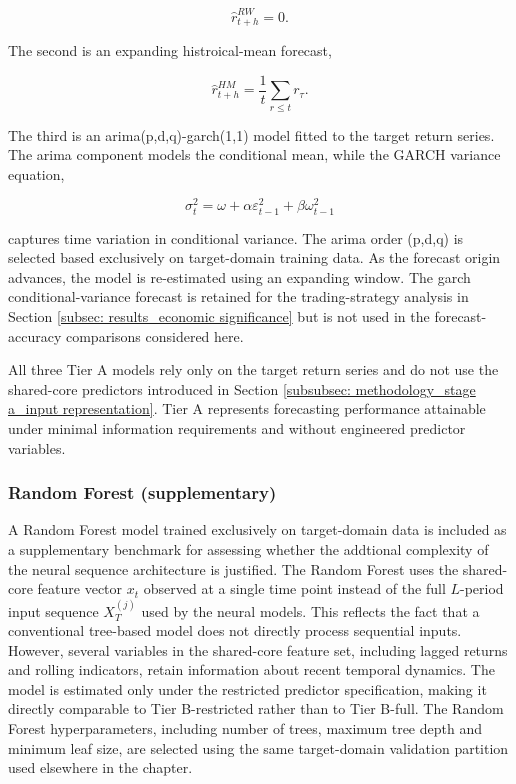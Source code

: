 \begin{equation}
    \hat r_{t+h}^{RW}=0.
\end{equation}

\noindent The second is an expanding histroical-mean forecast, 

\begin{equation}
    \hat{r}_{t+h}^{HM}=\frac 1 t \sum_{r \leq t} r_\tau .
\end{equation}

\noindent The third is an \ac{arima}(p,d,q)-\ac{garch}(1,1) model fitted to the target return series. The \ac{arima} component models the conditional mean, while the GARCH variance equation, 

\begin{equation}
    \sigma_t^2=\omega+\alpha \varepsilon^2_{t-1}+\beta \omega_{t-1}^2
\end{equation}

\noindent captures time variation in conditional variance. The \ac{arima} order (p,d,q) is selected  based exclusively on target-domain training data. As the forecast origin advances, the model is re-estimated using an expanding window. The \ac{garch} conditional-variance forecast is retained for the trading-strategy analysis in Section \ref{subsec: results_economic significance} but is not used in the forecast-accuracy comparisons considered here.

All three Tier A models rely only on the target return series and do not use the shared-core predictors introduced in Section \ref{subsubsec: methodology_stage a_input representation}. Tier A represents forecasting performance attainable under minimal information requirements and without engineered predictor variables.

\subsubsection{Random Forest (supplementary)}
A Random Forest model trained exclusively on target-domain data is included as a supplementary benchmark for assessing whether the addtional complexity of the neural sequence architecture is justified. The Random Forest uses the shared-core feature vector $x_t$ observed at a single time point instead of the full $L$-period input sequence $X_T^{(j)}$ used by the neural models. This reflects the fact that a conventional tree-based model does not directly process sequential inputs. However, several variables in the shared-core feature set, including lagged returns and rolling indicators, retain information about recent temporal dynamics. The model is estimated only under the restricted predictor specification, making it directly comparable to Tier B-restricted rather than to Tier B-full. The Random Forest hyperparameters, including number of trees, maximum tree depth and minimum leaf size, are selected using the same target-domain validation partition used elsewhere in the chapter.

